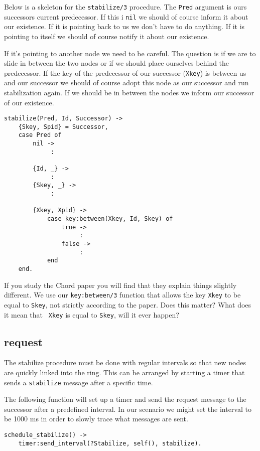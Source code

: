 \documentclass[a4paper,11pt]{article}
\begin{document}
Below is a skeleton for the {\tt stabilize/3} procedure. The {\tt Pred}
argument is ours successors current predecessor. If this i {\tt nil}
we should of course inform it about our existence. If it is pointing
back to us we don't have to do anything. If it is pointing to itself
we should of course notify it about our existence.

If it's pointing to another node we need to be careful. The question
is if we are to slide in between the two nodes or if we should place
ourselves behind the predecessor. If the key of the predecessor of our
successor ({\tt Xkey}) is between us and our successor we should of
course adopt this node as our successor and run stabilization
again. If we should be in between the nodes we inform our successor of
our existence.


\begin{verbatim}
stabilize(Pred, Id, Successor) ->
    {Skey, Spid} = Successor,
    case Pred of
        nil ->
             :

        {Id, _} ->
             :
        {Skey, _} ->
             :

        {Xkey, Xpid} ->
            case key:between(Xkey, Id, Skey) of
                true ->
                     :
                false ->
                     :
            end
    end.
\end{verbatim}

If you study the Chord paper you will find that they explain things
slightly different. We use our {\tt key:between/3} function that
allows the key {\tt Xkey} to be equal to {\tt Skey}, not strictly
according to the paper. Does this matter? What does it mean that {\tt
  Xkey} is equal to {\tt Skey}, will it ever happen?


\subsection{request}

The stabilize procedure must be done with regular intervals so
that new nodes are quickly linked into the ring. This can be arranged
by starting a timer that sends a {\tt stabilize} message after a
specific time. 

 The following function will set up a timer and send
the request message to the successor after a predefined interval. In
our scenario we might set the interval to be 1000 ms in order to slowly
trace what messages are sent.


\begin{verbatim}
schedule_stabilize() ->
    timer:send_interval(?Stabilize, self(), stabilize).
\end{verbatim}
\end{document}

